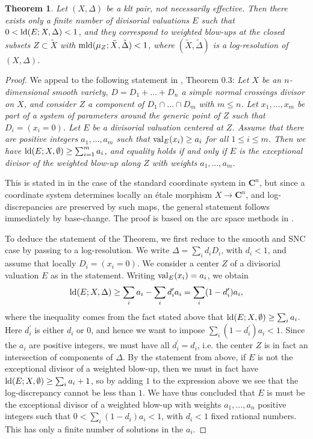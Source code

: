 \documentclass[11pt]{amsart}
\theoremstyle{plain}
\newtheorem{theorem}{Theorem}[section]
\theoremstyle{definition}
\newcommand{\CC}{\mathbf{C}}
\begin{document}
\begin{theorem}\label{valuations}
Let $(X,\Delta)$ be a klt pair, not necessarily effective. Then there exists only a finite number of divisorial valuations $E$ 
such that $0 < {\rm ld} (E; X, \Delta) < 1$, and they correspond to weighted blow-ups at the closed subsets $Z\subset \tilde X$ 
with ${\rm mld}(\mu_Z; \tilde X, \tilde{\Delta}) < 1$, where $(\tilde X, \tilde{\Delta})$ is a log-resolution of $(X, \Delta)$. 
\end{theorem}
\begin{proof}
We appeal to the following statement in \cite{dfei}, Theorem 0.3: \emph{Let $X$ be an
$n$-dimensional smooth variety, $D = D_1+ \ldots +D_n$ a simple normal crossings divisor on $X$, 
and consider $Z$ a component of $D_1 \cap \ldots \cap D_m$ with $m \le n$. Let $x_1, \ldots, x_m$ be part of a 
system of parameters around the generic point of $Z$ such that $D_i = (x_i = 0)$. Let $E$ be a divisorial valuation centered at $Z$. Assume that there are positive integers $a_1, \ldots, a_m$ such that ${\rm val}_E (x_i) 
\ge a_i$ for all $1\le i\le m$. Then we have ${\rm ld}(E; X, \emptyset) \ge \sum_{i =1}^m a_i$, and equality holds if and only if $E$ is the exceptional divisor of the weighted blow-up along $Z$ with weights $a_1, \ldots, a_m$.}

This is stated in \cite{dfei} in the case of the standard coordinate system in $\CC^n$, but since a coordinate system determines locally an \'etale morphism $X \rightarrow \CC^n$, and log-discrepancies are preserved by such maps, the general statement follows immediately by base-change. The proof is based on the arc space methods in \cite{elm}.

To deduce the statement of the Theorem, we first reduce to the smooth and SNC case by passing to a log-resolution.  We write $\Delta = \sum_i d_i D_i$, 
with $d_i <1$, and assume that locally $D_i = (x_i = 0)$. We consider a center $Z$ of a divisorial valuation $E$ as in the statement. Writing ${\rm val}_E (x_i) = a_i$, we obtain
$${\rm ld} (E; X, \Delta) \ge \sum_i a_i - \sum_i d_i^\prime a_i = \sum_i (1-d_i^\prime ) a_i,$$
where the inequality comes from the fact stated above that ${\rm ld}(E; X, \emptyset) \ge \sum_i a_i$.
Here $d_i^\prime$ is either $d_i$ or $0$, and hence we want to impose  
$\sum_i (1-d_i^\prime ) a_i < 1$. Since the $a_i$ are positive integers, we must have all 
$d_i^\prime = d_i$, i.e. the center $Z$ is in fact an intersection of components of $\Delta$.
By the statement from \cite{dfei} above, if $E$ is not the exceptional divisor of a weighted blow-up, then we must in fact have ${\rm ld}(E; X, \emptyset) \ge \sum_i a_i + 1$, so by adding $1$ to the expression above we see that the log-discrepancy cannot be less than $1$. We have thus concluded that 
$E$ is must be the exceptional divisor of a weighted blow-up with weights $a_1, \ldots, a_n$ positive 
integers such that $0 < \sum_i (1-d_i) a_i < 1$, with $d_i < 1$ fixed rational numbers. This has only a
finite number of solutions in the $a_i$.
\end{proof}
\end{document}
